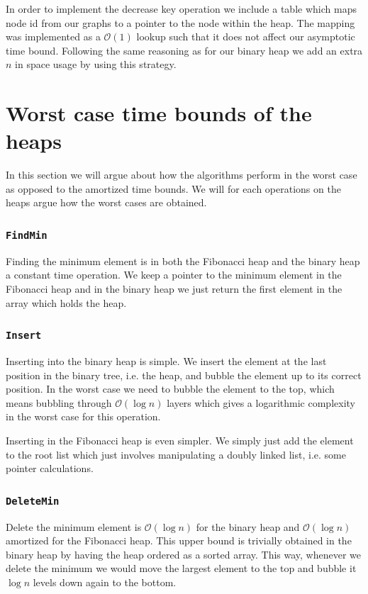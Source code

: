 \documentclass[a4paper,oneside,article,11pt]{memoir}
\begin{document}
In order to implement the decrease key operation we include a table which maps node id from our graphs to a pointer to the node within the heap. The mapping was implemented as a $\mathcal{O}(1)$ lookup such that it does not affect our asymptotic time bound. Following the same reasoning as for our binary heap we add an extra $n$ in space usage by using this strategy.

\chapter{Worst case time bounds of the heaps}
\label{cpt:worst_case_bounds}
In this section we will argue about how the algorithms perform in the worst case as opposed to the amortized time bounds. We will for each operations on the heaps argue how the worst cases are obtained.

\subsection{\texttt{FindMin}}
Finding the minimum element is in both the Fibonacci heap and the binary heap a constant time operation. We keep a pointer to the minimum element in the Fibonacci heap and in the binary heap we just return the first element in the array which holds the heap.

\subsection{\texttt{Insert}}
Inserting into the binary heap is simple. We insert the element at the last position in the binary tree, i.e. the heap, and bubble the element up to its correct position. In the worst case we need to bubble the element to the top, which means bubbling through $\mathcal{O}(\log n)$ layers which gives a logarithmic complexity in the worst case for this operation.

Inserting in the Fibonacci heap is even simpler. We simply just add the element to the root list which just involves manipulating a doubly linked list, i.e. some pointer calculations. 

\subsection{\texttt{DeleteMin}}
Delete the minimum element is $\mathcal{O}(\log{n})$ for the binary heap and $\mathcal{O}(\log{n})$ amortized for the Fibonacci heap. This upper bound is trivially obtained in the binary heap by having the heap ordered as a sorted array. This way, whenever we delete the minimum we would move the largest element to the top and bubble it $\log n$ levels down again to the bottom.
\end{document}
